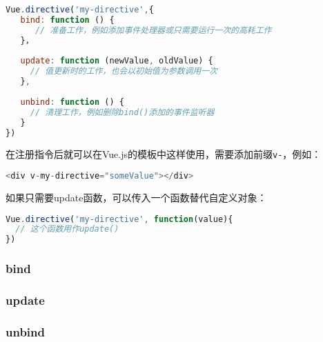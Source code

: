 \begin{lstlisting}[language=JavaScript]
Vue.directive('my-directive',{
   bind: function () {
      // 准备工作，例如添加事件处理器或只需要运行一次的高耗工作
   }，
   
   update: function (newValue, oldValue) {
     // 值更新时的工作，也会以初始值为参数调用一次
   },
   
   unbind: function () {
     // 清理工作，例如删除bind()添加的事件监听器
   }
})
\end{lstlisting}


在注册指令后就可以在Vue.js的模板中这样使用，需要添加前缀\texttt{v-}，例如：


\begin{lstlisting}[language=JavaScript]
<div v-my-directive="someValue"></div>
\end{lstlisting}

如果只需要update函数，可以传入一个函数替代自定义对象：


\begin{lstlisting}[language=JavaScript]
Vue.directive('my-directive', function(value){
  // 这个函数用作update()
})
\end{lstlisting}

\subsubsection{bind}





\subsubsection{update}


\subsubsection{unbind}



\begin{lstlisting}[language=JavaScript]

\end{lstlisting}




\begin{lstlisting}[language=JavaScript]

\end{lstlisting}




\begin{lstlisting}[language=JavaScript]

\end{lstlisting}




\begin{lstlisting}[language=JavaScript]

\end{lstlisting}




\begin{lstlisting}[language=JavaScript]

\end{lstlisting}